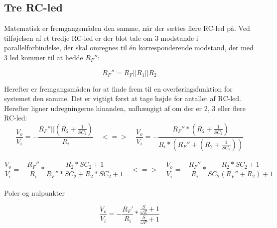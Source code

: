 \subsection{Tre RC-led}
\label{TreRCLed}

Matematisk er fremgangsmåden den samme, når der sættes flere RC-led på. Ved tilføjelsen af et tredje RC-led er der blot tale om 3 modstande i parallelforbindelse, der skal omregnes til én korresponderende modstand, der med 3 led kommer til at hedde $R_F''$:

\begin{equation}
	R_F''=R_F||R_1||R_2
\end{equation}

\noindent
Herefter er fremgangsmåden for at finde frem til en overføringsfunktion for systemet den samme. Det er vigtigt først at tage højde for antallet af RC-led. Herefter ligner udregningerne hinanden, uafhængigt af om der er 2, 3 eller flere RC-led:\\

\begin{equation}
	\frac{V_o}{V_i}=-\frac{R_F''||(R_2+\frac{1}{SC_2})}{R_i}
\quad
	<=>
\quad
	\frac{V_o}{V_i}=-\frac{R_F''*(R_2+\frac{1}{SC_2})}{R_i*(R_F''+(R_2+\frac{1}{SC_2}))}
\end{equation}\\


\begin{equation}
		\frac{V_o}{V_i}=-\frac{R_F''}{R_i}* \frac{R_2*SC_2+1}{R_F''*SC_2+R_2*SC_2+1}
\quad
	<=>
\quad
	\frac{V_o}{V_i}=-\frac{R_F''}{R_i}*\frac{R_2*SC_2+1}{SC_2(R_F''+R_2)+1}
\end{equation}\\


\noindent
Poler og nulpunkter

\begin{equation}
	\frac{V_o}{V_i}=-\frac{R_F'}{R_i}*\frac{\frac{S}{\omega Z}+1}{\frac{S}{\omega P}+1}
\end{equation}